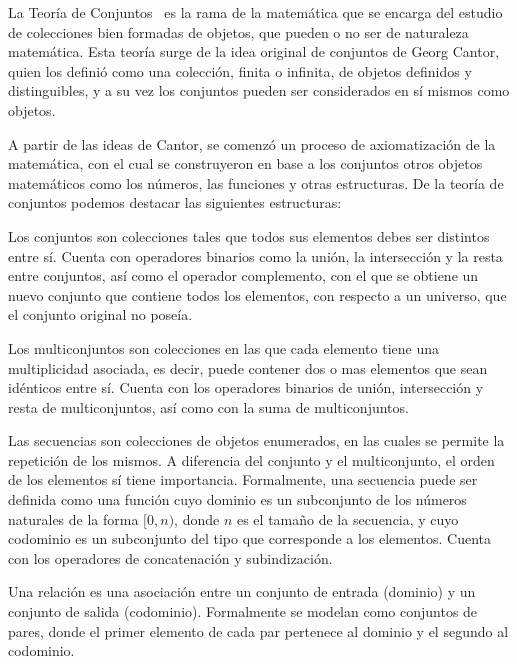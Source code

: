 La Teoría de Conjuntos~\cite{gries} es la rama de la matemática que se encarga
del estudio de colecciones bien formadas de objetos, que pueden o no ser de
naturaleza matemática. Esta teoría surge de la idea original de conjuntos de
Georg Cantor, quien los definió como una colección, finita o infinita, de
objetos definidos y distinguibles, y a su vez los conjuntos pueden ser
considerados en sí mismos como objetos.

A partir de las ideas de Cantor, se comenzó un proceso de axiomatización de la
matemática, con el cual se construyeron en base a los conjuntos otros objetos
matemáticos como los números, las funciones y otras estructuras. De la teoría de
conjuntos podemos destacar las siguientes estructuras:

\begin{description}[leftmargin=!,labelwidth=\widthof{\bfseries Multiconjunto}]

  \item [Conjunto] Los conjuntos son colecciones tales que todos sus elementos
  debes ser distintos entre sí. Cuenta con operadores binarios como la unión, la
  intersección y la resta entre conjuntos, así como el operador complemento, con
  el que se obtiene un nuevo conjunto que contiene todos los elementos, con
  respecto a un universo, que el conjunto original no poseía.

  \item [Multiconjunto] Los multiconjuntos son colecciones en las que cada
  elemento tiene una multiplicidad asociada, es decir, puede contener dos o mas
  elementos que sean idénticos entre sí. Cuenta con los operadores  binarios de
  unión, intersección y resta de multiconjuntos, así como con la suma de
  multiconjuntos.

  \item [Secuencia] Las secuencias son colecciones de objetos enumerados, en las
  cuales se permite la repetición de los mismos. A diferencia del conjunto y el
  multiconjunto, el orden de los elementos sí tiene importancia. Formalmente,
  una secuencia puede ser definida como una función cuyo dominio es un 
  subconjunto de los números naturales de la forma $[0, n)$, donde $n$ es el 
  tamaño de la secuencia, y cuyo codominio es un subconjunto del tipo que 
  corresponde a los elementos. Cuenta con los operadores de concatenación y
  subindización.

  \item [Relación] Una relación es una asociación entre un conjunto de entrada
  (dominio) y un conjunto de salida (codominio). Formalmente se modelan como
  conjuntos de pares, donde el primer elemento de cada par pertenece al dominio
  y el segundo al codominio.


\end{description}
